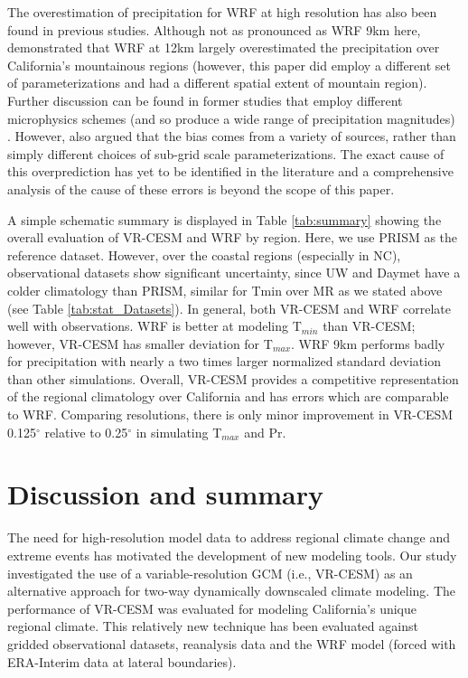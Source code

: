 \documentclass[draft,ms]{agutex}   %
\begin{document}
\begin{article}
The overestimation of precipitation for WRF at high resolution has also been found in previous studies. Although not as pronounced as WRF 9km here, \citet{caldwell2009evaluation} demonstrated that WRF at 12km largely overestimated the precipitation over California's mountainous regions (however, this paper did employ a different set of parameterizations and had a different spatial extent of mountain region). Further discussion can be found in former studies that employ different microphysics schemes (and so produce a wide range of precipitation magnitudes) \citep{jankov2005impact, chin2010preliminary, caldwell2010california}. However, \citet{caldwell2009evaluation} also argued that the bias comes from a variety of sources, rather than simply different choices of sub-grid scale parameterizations. The exact cause of this overprediction has yet to be identified in the literature and a comprehensive analysis of the cause of these errors is beyond the scope of this paper. 

A simple schematic summary is displayed in Table \ref{tab:summary} showing the overall evaluation of VR-CESM and WRF by region. Here, we use PRISM as the reference dataset. However, over the coastal regions (especially in NC), observational datasets show significant uncertainty, since UW and Daymet have a colder climatology than PRISM, similar for Tmin over MR as we stated above (see Table \ref{tab:stat_Datasets}). In general, both VR-CESM and WRF correlate well with observations. WRF is better at modeling T$_{min}$ than VR-CESM; however, VR-CESM has smaller deviation for T$_{max}$. WRF 9km performs badly for precipitation with nearly a two times larger normalized standard deviation than other simulations. Overall, VR-CESM provides a competitive representation of the regional climatology over California and has errors which are comparable to WRF. Comparing resolutions, there is only minor improvement in VR-CESM 0.125$^\circ$ relative to 0.25$^\circ$ in simulating T$_{max}$ and Pr.

\section{Discussion and summary} \label{sec:Discussion}

The need for high-resolution model data to address regional climate change and extreme events has motivated the development of new modeling tools.  Our study investigated the use of a variable-resolution GCM (i.e., VR-CESM) as an alternative approach for two-way dynamically downscaled climate modeling. The performance of VR-CESM was evaluated for modeling California's unique regional climate. This relatively new technique has been evaluated against gridded observational datasets, reanalysis data and the WRF model (forced with ERA-Interim data at lateral boundaries).


\end{article}
\end{document}
